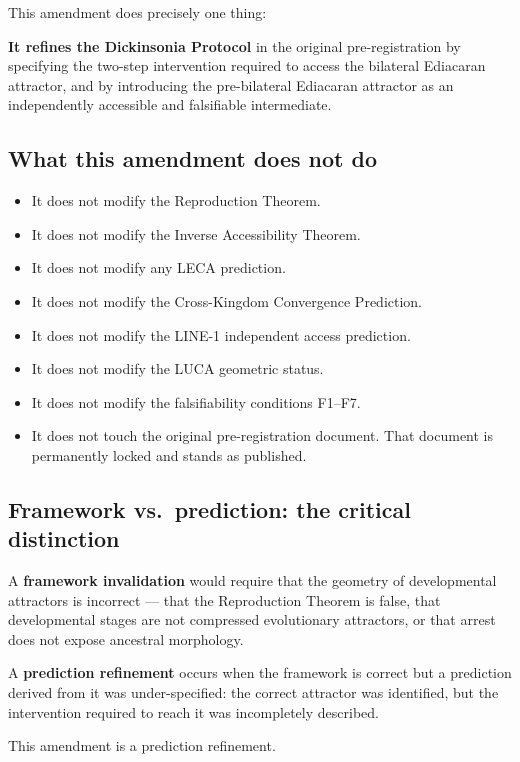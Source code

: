 \documentclass[12pt, a4paper]{article}
\theoremstyle{definition}
\theoremstyle{remark}
\begin{document}
This amendment does precisely one thing:

\textbf{It refines the Dickinsonia Protocol} in the original
pre-registration by specifying the two-step intervention
required to access the bilateral Ediacaran attractor, and
by introducing the pre-bilateral Ediacaran attractor as an
independently accessible and falsifiable intermediate.

\subsection{What this amendment does not do}

\begin{itemize}
  \item It does not modify the Reproduction Theorem.
  \item It does not modify the Inverse Accessibility Theorem.
  \item It does not modify any LECA prediction.
  \item It does not modify the Cross-Kingdom Convergence
        Prediction.
  \item It does not modify the LINE-1 independent access
        prediction.
  \item It does not modify the LUCA geometric status.
  \item It does not modify the falsifiability conditions F1--F7.
  \item It does not touch the original pre-registration
        document. That document is permanently locked and
        stands as published.
\end{itemize}

\subsection{Framework vs.\ prediction: the critical
distinction}

A \textbf{framework invalidation} would require that the
geometry of developmental attractors is incorrect --- that
the Reproduction Theorem is false, that developmental stages
are not compressed evolutionary attractors, or that
arrest does not expose ancestral morphology.

A \textbf{prediction refinement} occurs when the framework
is correct but a prediction derived from it was
under-specified: the correct attractor was identified, but
the intervention required to reach it was incompletely
described.

This amendment is a prediction refinement.
\end{document}

